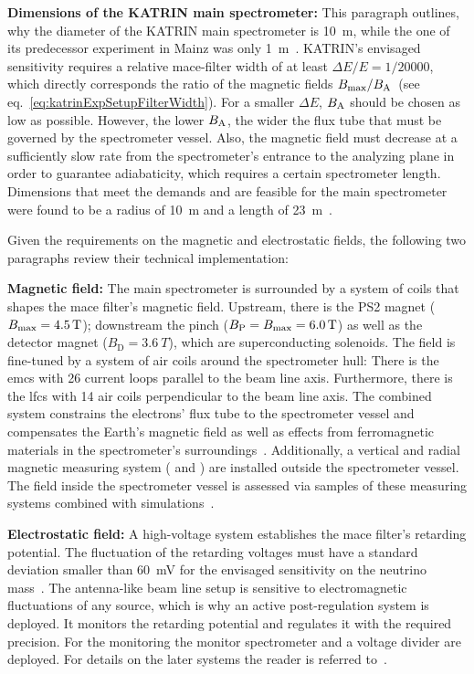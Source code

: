 {{\par \textbf{Dimensions of the KATRIN main spectrometer:} This paragraph outlines, why the diameter of the KATRIN main spectrometer is \SI{10}{m}, while the one of its predecessor experiment in Mainz was only \SI{1}{m}~\cite{Kraus2005}. KATRIN's envisaged sensitivity requires a relative \gls{mace}-filter width of at least $\Delta E/E = 1/20000$, which directly corresponds the ratio of the magnetic fields $B_\mathrm{max}/B_\mathrm{A}$~(see eq.~\ref{eq:katrinExpSetupFilterWidth}). For a smaller $\Delta E$, $B_\mathrm{A}$ should be chosen as low as possible. However, the lower $B_\mathrm{A}$, the wider the flux tube that must be governed by the spectrometer vessel. Also, the magnetic field must decrease at a sufficiently slow rate from the spectrometer's entrance to the analyzing plane in order to guarantee adiabaticity, which requires a certain spectrometer length. Dimensions that meet the demands and are feasible for the main spectrometer were found to be a radius of \SI{10}{m} and a length of \SI{23}{m}~\cite{Angrik:2005ep, Valerius2004}.}

Given the requirements on the magnetic and electrostatic fields, the following two paragraphs review their technical implementation:

{\par \textbf{Magnetic field:} The main spectrometer is surrounded by a system of coils that shapes the \gls{mace} filter's  magnetic field. Upstream, there is the PS2 magnet ($B_\mathrm{max}=\SI{4.5}{T}$); downstream the pinch ($B_\mathrm{P}=B_\mathrm{max}=\SI{6.0}{T}$) as well as the detector magnet ($B_\mathrm{D}=\SI{3.6}{T}$), which are superconducting solenoids. The field is fine-tuned by a system of air coils around the spectrometer hull: There is the \gls{emcs} with 26 current loops parallel to the beam line axis. Furthermore, there is the \gls{lfcs} with 14 air coils perpendicular to the beam line axis. The combined system constrains the electrons' flux tube to the spectrometer vessel and compensates the Earth's magnetic field as well as effects from ferromagnetic materials in the spectrometer's surroundings~\cite{Erhard2018}. Additionally, a vertical and radial magnetic measuring system ( and ) are installed outside the spectrometer vessel. The field inside the spectrometer vessel is assessed via samples of these measuring systems combined with simulations~\cite{Letnev2018}.}

{\par \textbf{Electrostatic field:} A high-voltage system establishes the \gls{mace} filter's retarding potential. The fluctuation of the retarding voltages must have a standard deviation smaller than \SI{60}{mV} for the envisaged sensitivity on the neutrino mass~\cite{Angrik:2005ep}. The antenna-like beam line setup is sensitive to electromagnetic fluctuations of any source, which is why an active post-regulation system is deployed. It monitors the retarding potential and regulates it with the required precision. For the monitoring the monitor spectrometer and a voltage divider are deployed. For details on the later systems the reader is referred to~\cite{Thuemmler2009,Erhard2014,Zboril2011}.}

}
